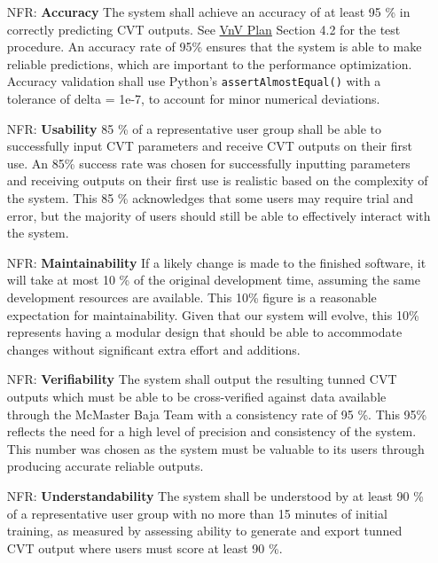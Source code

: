 \documentclass[12pt]{article}
\newcounter{nfrnum} %
\begin{document}
\noindent \begin{itemize}

\item[NFR\refstepcounter{nfrnum}\thenfrnum \label{NFR_Accuracy}:]\textbf{Accuracy} The system shall achieve an accuracy of at least 95 \% in correctly predicting CVT outputs. 
See \href{https://github.com/gr812b/CVT-Simulator/blob/main/docs/VnVPlan/VnVPlan.pdf}{VnV Plan} Section 4.2 for the test procedure. An accuracy rate of 95\% ensures that the system is able to make reliable predictions, which are important to the performance optimization. 
Accuracy validation shall use Python’s \texttt{assertAlmostEqual()} with a tolerance of delta = 1e-7, to account for minor numerical deviations.\item[NFR\refstepcounter{nfrnum}\thenfrnum \label{NFR_Usability}:] \textbf{Usability} 85 \% of a representative user group shall be able to successfully input CVT parameters and receive CVT outputs on their first use.
An 85\% success rate was chosen for successfully inputting parameters and receiving outputs on their first use is realistic based on the complexity of the system. 
This 85 \% acknowledges that some users may require trial and error, but the majority of users should still be able to effectively interact with the system. 
\item[NFR\refstepcounter{nfrnum}\thenfrnum \label{NFR_Maintainability}:]\textbf{Maintainability} If a likely change is made to the finished software, it will take at most 10 \% of the original development time, assuming the same development resources are available.
This 10\% figure is a reasonable expectation for maintainability. 
Given that our system will evolve, this 10\% represents having a modular design that should be able to accommodate changes without significant extra effort and additions. 
\item[NFR\refstepcounter{nfrnum}\thenfrnum \label{NFR_Verifiability}:] \textbf{Verifiability} The system shall output the resulting tunned CVT outputs which must be able to be cross-verified against data available through the McMaster Baja Team with a consistency rate of 95 \%.
This 95\% reflects the need for a high level of precision and consistency of the system. 
This number was chosen as the system must be valuable to its users through producing accurate reliable outputs. 
\item[NFR\refstepcounter{nfrnum}\thenfrnum \label{NFR_Understandability}:] \textbf{Understandability} The system shall be understood by at least 90 \% of a representative user group with no more than 15 minutes of initial training, as measured by assessing ability to generate and export tunned CVT output where users must score at least 90 \%.

\end{itemize}
\end{document}
